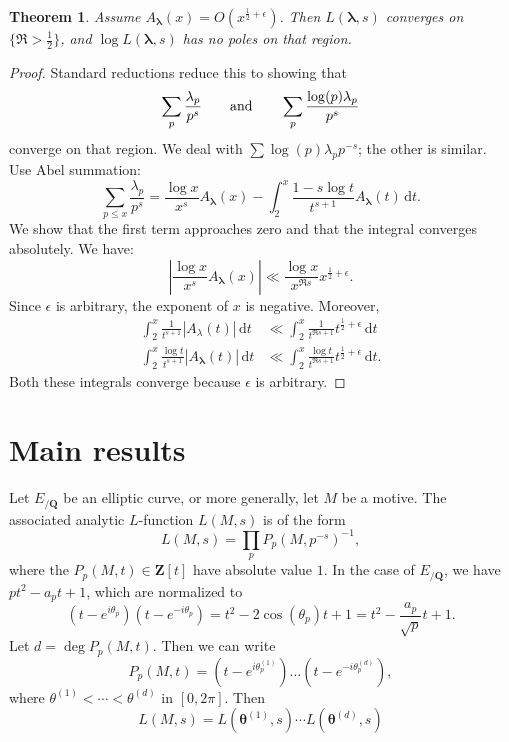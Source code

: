\documentclass{article}
\newcommand{\blambda}{{\boldsymbol{\lambda}}}
\newcommand{\bQ}{\mathbf{Q}}
\newcommand{\btheta}{{\boldsymbol{\theta}}}
\newcommand{\bZ}{\mathbf{Z}}
\newcommand{\dd}{\mathrm{d}}
\newtheorem{theorem}[subsection]{Theorem}
\theoremstyle{definition}
\begin{document}
\begin{theorem}
Assume $A_\blambda(x) = O(x^{\frac 1 2 +\epsilon})$. Then $L(\blambda,s)$ 
converges on $\{\Re>\frac 1 2\}$, and $\log L(\blambda,s)$ has no poles on that 
region. 
\end{theorem}
\begin{proof}
Standard reductions reduce this to showing that 
\[
	\sum_p \frac{\lambda_p}{p^s} \qquad \textnormal{and}\qquad \sum_p \frac{\log(p) \lambda_p}{p^s} 
\]
converge on that region. We deal with $\sum \log(p)\lambda_p p^{-s}$; the 
other is similar. Use Abel summation:
\[
	\sum_{p\leqslant x} \frac{\lambda_p}{p^s}
		= \frac{\log x}{x^s} A_\blambda(x) - \int_2^x \frac{1-s\log t}{t^{s+1}} A_\blambda(t)\, \dd t .
\]
We show that the first term approaches zero and that the integral converges 
absolutely. We have: 
\[
	\left| \frac{\log x}{x^s} A_\blambda(x)\right| \ll \frac{\log x}{x^{\Re s}} x^{\frac 1 2+\epsilon}  .
\]
Since $\epsilon$ is arbitrary, the exponent of $x$ is negative. Moreover, 
\begin{align*}
	\int_2^x \frac{1}{t^{s+1}} | A_\lambda(t)|\, \dd t
		& \ll \int_2^x \frac{1}{t^{\Re s+1}} t^{\frac 1 2+\epsilon} \, \dd t \\
	\int_2^x \frac{\log t}{t^{s+1}} |A_\blambda(t)|\, \dd t
		& \ll \int_2^x \frac{\log t}{t^{\Re s+1}} t^{\frac 1 2+\epsilon}\, \dd t .
\end{align*}
Both these integrals converge because $\epsilon$ is arbitrary. 
\end{proof}





\section{Main results}\label{sec:main-result}

Let $E_{/\bQ}$ be an elliptic curve, or more generally, let 
$M$ be a motive. The associated analytic $L$-function $L(M,s)$ is of the form 
\[
	L(M,s) = \prod_p P_p(M,p^{-s})^{-1} ,
\]
where the $P_p(M,t)\in \bZ[t]$ have absolute value $1$. In the case of 
$E_{/\bQ}$, we have $p t^2-a_p t + 1$, which are normalized to 
\[
	(t-e^{i\theta_p})(t-e^{-i\theta_p}) = t^2 - 2\cos(\theta_p) t + 1 = t^2 - \frac{a_p}{\sqrt p} t + 1 .
\]
Let $d=\deg P_p(M,t)$. Then we can write 
\[
	P_p(M,t) = (t-e^{i\theta_p^{(1)}}) \dots (t-e^{-i\theta_p^{(d)}}) ,
\]
where $\theta^{(1)} < \cdots < \theta^{(d)}$ in $[0,2\pi]$. Then 
\[
	L(M,s) = L(\btheta^{(1)},s) \dotsm L(\btheta^{(d)},s)
\]
\end{document}
